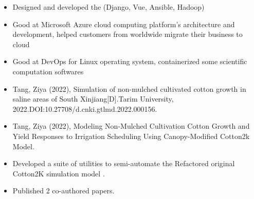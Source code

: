 \documentclass{resume}
\begin{document}
\begin{itemize}
  \item Designed and developed the  (Django, Vue, Ansible, Hadoop)
  \item Good at Microsoft Azure cloud computing platform's architecture and development, helped customers from worldwide migrate their business to cloud
  \item Good at DevOps for Linux operating system, containerized some scientific computation softwares
\end{itemize}

\begin{itemize}
  \item Tang, Ziya (2022), Simulation of non{-}mulched cultivated cotton growth in saline areas of South Xinjiang[D].Tarim University, 2022.DOI:10.27708/d.cnki.gtlmd.2022.000156.
  \item Tang, Ziya (2022), Modeling Non-Mulched Cultivation Cotton Growth and Yield Responses to Irrigation Scheduling Using Canopy-Modified Cotton2k Model.
\end{itemize}

\begin{itemize}
  \item Developed a suite of utilities to semi-automate the
    Refactored original Cotton2K simulation model
    .
  \item Published 2 co-authored papers.
\end{itemize}
\end{document}
